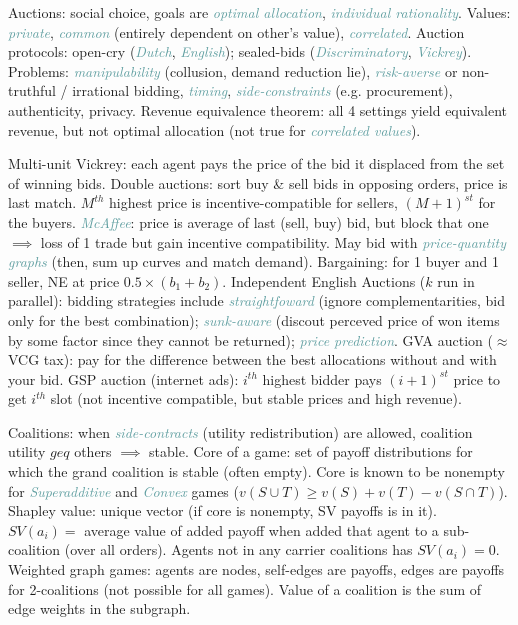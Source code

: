 \documentclass[10pt,a4paper,landscape]{article}
\newcommand{\concept}[1]{\textcolor{Emerald}{#1}} %
\newcommand{\subconcept}[1]{\textcolor{CadetBlue}{\textit{#1}}}
\renewcommand{\section}[1]{
    \vspace{-0.3cm}
    \begin{center}
      \color{Bittersweet}
      \hrulefill{\small~~#1~~}\hrulefill
    \end{center}
    \vspace{-0.3cm}
  }
\renewcommand{\subsection}[1]{\section{#1}}
\begin{document}
\begin{multicols*}{4}
\concept{Auctions}: social choice, goals are \subconcept{optimal allocation}, \subconcept{individual rationality}.
\concept{Values}: \subconcept{private}, \subconcept{common} (entirely dependent on other's value), \subconcept{correlated}.
\concept{Auction protocols}: open-cry (\subconcept{Dutch}, \subconcept{English}); sealed-bids (\subconcept{Discriminatory}, \subconcept{Vickrey}). Problems: \subconcept{manipulability} (collusion, demand reduction lie), \subconcept{risk-averse} or non-truthful / irrational bidding, \subconcept{timing}, \subconcept{side-constraints} (e.g. procurement), authenticity, privacy.
\concept{Revenue equivalence theorem}: all 4 settings yield equivalent revenue, but not optimal allocation (not true for \subconcept{correlated values}).

\concept{Multi-unit Vickrey}: each agent pays the price of the bid it displaced from the set of winning bids.
\concept{Double auctions}: sort buy \& sell bids in opposing orders, price is last match. $M^{th}$ highest price is incentive-compatible for sellers, $(M+1)^{st}$ for the buyers. \subconcept{McAffee}: price is average of last (sell, buy) bid, but block that one $\implies$ loss of 1 trade but gain incentive compatibility. May bid with \subconcept{price-quantity graphs} (then, sum up curves and match demand).
\concept{Bargaining}: for 1 buyer and 1 seller, NE at price $0.5 \times (b_1 + b_2)$.
\concept{Independent English Auctions} ($k$ run in parallel): bidding strategies include \subconcept{straightfoward} (ignore complementarities, bid only for the best combination); \subconcept{sunk-aware} (discout perceved price of won items by some factor since they cannot be returned); \subconcept{price prediction}.
\concept{GVA auction} ($\approx$ VCG tax): pay for the difference between the best allocations without and with your bid.
\concept{GSP auction} (internet ads): $i^{th}$ highest bidder pays $(i+1)^{st}$ price to get $i^{th}$ slot (not incentive compatible, but stable prices and high revenue).

\subsection{Coalitions}

\concept{Coalitions}: when \subconcept{side-contracts} (utility redistribution) are allowed, coalition utility $geq$ others $\implies$ stable.
\concept{Core} of a game: set of payoff distributions for which the grand coalition is stable (often empty).
Core is known to be nonempty for \subconcept{Superadditive} and \subconcept{Convex} games ($v(S \cup T) \geq v(S) + v(T) - v(S \cap T)$).
\concept{Shapley value}: unique vector (if core is nonempty, SV payoffs is in it). $SV(a_i) = $ average value of added payoff when added that agent to a sub-coalition (over all orders). Agents not in any carrier coalitions has $SV(a_i) = 0$.
\concept{Weighted graph games}: agents are nodes, self-edges are payoffs, edges are payoffs for 2-coalitions (not possible for all games). Value of a coalition is the sum of edge weights in the subgraph.


\end{multicols*}
\end{document}
